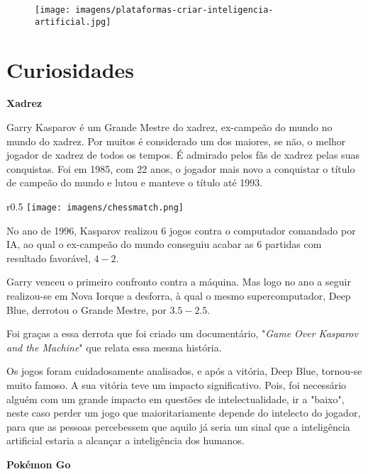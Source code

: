 \documentclass{report}
\begin{document}
\begin{figure}[ht]
    \centering
    \texttt{[image: imagens/plataformas-criar-inteligencia-artificial.jpg]}
    \caption{}
    \label{fig:AIi}
\end{figure}

\chapter{Curiosidades}
\label{chap.curiosidades}

\begin{center}
    \Huge{\textbf{Xadrez}}
\end{center}
\vspace{20pt}

Garry Kasparov é um Grande Mestre do xadrez, ex-campeão do mundo no mundo do xadrez. Por muitos é considerado um dos maiores, se não, o melhor jogador de xadrez de todos os tempos. É admirado pelos fãs de xadrez pelas suas conquistas. Foi em 1985, com 22 anos, o jogador mais novo a conquistar o título de campeão do mundo e lutou e manteve o título até 1993. 
\vspace{5pt}
\begin{wrapfigure}{r}{0.5\textwidth} 
   \centering
    \texttt{[image: imagens/chessmatch.png]}
    \tiny{\caption{}}
    \label{fig:chess}
\end{wrapfigure}

No ano de 1996, Kasparov realizou 6 jogos contra o computador comandado por IA, ao qual o ex-campeão do mundo conseguiu acabar as 6 partidas com resultado favorável, \(4-2\).

Garry venceu o primeiro confronto contra a máquina. Mas logo no ano a seguir realizou-se em Nova Iorque a desforra, à qual o mesmo supercomputador, Deep Blue, derrotou o Grande Mestre, por \(3.5-2.5\).
 

Foi graças a essa derrota que foi criado um documentário, "\textit{Game Over Kasparov and the Machine}" que relata essa mesma história. 
\vspace{2pt}


Os jogos foram cuidadosamente analisados, e após a vitória, Deep Blue, tornou-se muito famoso. A sua vitória teve um impacto significativo. Pois, foi necessário alguém com um grande impacto em questões de 
intelectualidade, ir a "baixo", neste caso perder um jogo que maioritariamente depende do intelecto do jogador, para que as pessoas percebessem que aquilo já seria um sinal que a inteligência artificial estaria a alcançar a inteligência dos humanos. 
\clearpage
\vspace{100pt}
\begin{center}
    \Huge{\textbf{Pokémon Go}}   
\end{center}
\end{document}
